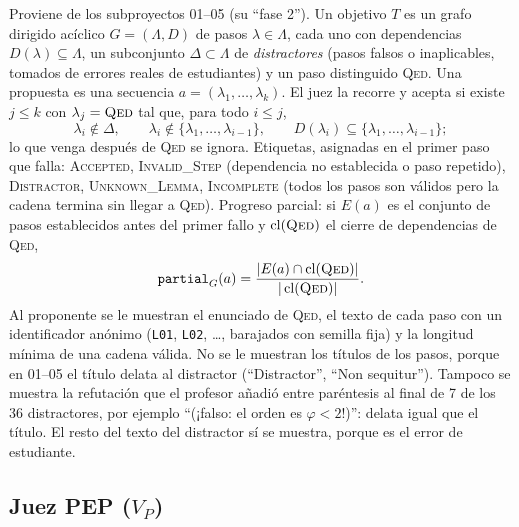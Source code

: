 \documentclass[11pt,a4paper]{article}
\theoremstyle{definition}
\theoremstyle{remark}
\newcommand{\lab}[1]{\textsc{#1}}
\newcommand{\cl}{\operatorname{cl}}
\newcommand{\VP}{\texorpdfstring{$V_P$}{V\_P}}
\begin{document}
Proviene de los subproyectos 01--05 (su ``fase 2''). Un objetivo $T$ es un grafo dirigido acíclico $G = (\Lambda, D)$ de pasos $\lambda \in \Lambda$, cada uno con dependencias $D(\lambda) \subseteq \Lambda$, un subconjunto $\Delta \subset \Lambda$ de \emph{distractores} (pasos falsos o inaplicables, tomados de errores reales de estudiantes) y un paso distinguido \lab{Qed}. Una propuesta es una secuencia $a = (\lambda_1, \dots, \lambda_k)$. El juez la recorre y acepta si existe $j \le k$ con $\lambda_j = \lab{Qed}$ tal que, para todo $i \le j$,
\[
  \lambda_i \notin \Delta,\qquad \lambda_i \notin \{\lambda_1,\dots,\lambda_{i-1}\},\qquad D(\lambda_i) \subseteq \{\lambda_1,\dots,\lambda_{i-1}\};
\]
lo que venga después de \lab{Qed} se ignora. Etiquetas, asignadas en el primer paso que falla: \lab{Accepted}, \lab{Invalid\_Step} (dependencia no establecida o paso repetido), \lab{Distractor}, \lab{Unknown\_Lemma}, \lab{Incomplete} (todos los pasos son válidos pero la cadena termina sin llegar a \lab{Qed}). Progreso parcial: si $E(a)$ es el conjunto de pasos establecidos antes del primer fallo y $\cl(\lab{Qed})$ el cierre de dependencias de \lab{Qed},
\[
  \texttt{partial}_G(a) = \frac{|E(a) \cap \cl(\lab{Qed})|}{|\cl(\lab{Qed})|}.
\]
Al proponente se le muestran el enunciado de \lab{Qed}, el texto de cada paso con un identificador anónimo (\texttt{L01}, \texttt{L02}, \dots, barajados con semilla fija) y la longitud mínima de una cadena válida. No se le muestran los títulos de los pasos, porque en 01--05 el título delata al distractor (``Distractor'', ``Non sequitur''). Tampoco se muestra la refutación que el profesor añadió entre paréntesis al final de 7 de los 36 distractores, por ejemplo ``(¡falso: el orden es $\varphi < 2$!)'': delata igual que el título. El resto del texto del distractor sí se muestra, porque es el error de estudiante.

\subsection{Juez PEP (\VP)}\label{sec:VP}
\end{document}
